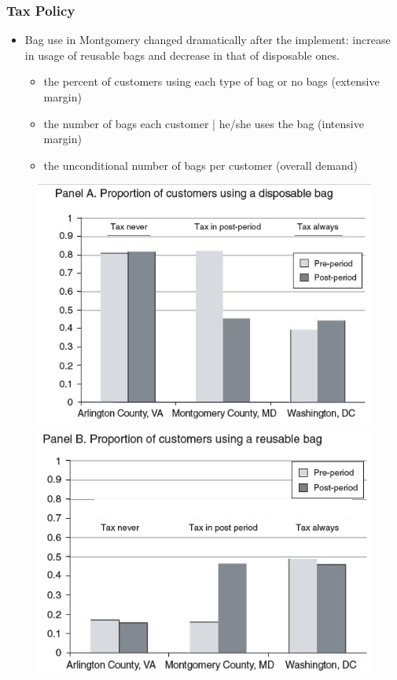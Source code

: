 \documentclass[dvipdfmx,11pt]{beamer}
\begin{document}
\begin{frame}\frametitle{Tax Policy}
  \begin{itemize}
    \small
    \item Bag use in Montgomery changed dramatically after the implement: increase in usage of reusable bags and decrease in that of disposable ones.
    \begin{itemize}
      \footnotesize
      \item the percent of customers using each type of bag or no bags (extensive margin)
      \item the number of bags each customer | he/she uses the bag (intensive margin)
      \item the unconditional number of bags per customer (overall demand)
    \end{itemize}
  \end{itemize}

  \begin{figure}[ht]
    \centering
    \includegraphics[scale = .5]{0807tanji/F3A}
    \includegraphics[scale = .5]{0807tanji/F3B}
  \end{figure}
\end{frame}
\end{document}

